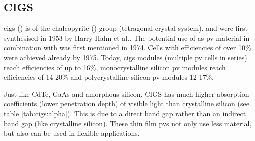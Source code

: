 \subsection{CIGS}
\gls{cigs} () is of the chalcopyrite () group (tetragonal crystal system). 
 and  were first synthesised in 1953 by Harry Hahn et al.\cite{hahn1953untersuchungen}.
The potential use of  as \gls{pv} material in combination with  was first mentioned in 1974\cite{wagner1974cuinse2}.
Cells with efficiencies of over 10\% were achieved already by 1975\cite{kazmerski1976thin}.
Today, 
\gls{cigs} modules (multiple \gls{pv} cells in series) 
reach efficiencies of up to 16\%\cite{feurer2017cigs},
monocrystalline silicon \gls{pv} modules reach efficiencies of 14-20\%
and polycrystalline silicon \gls{pv} modules 12-17\%\cite{mcevoy2011practical}.

Just like CdTe, GaAs and amorphous silicon, CIGS has much higher absorption coefficients 
(lower penetration depth) of visible light than crystalline silicon (see table \ref{tab:cigs:alpha}). 
This is due to a direct band gap rather than an indirect band gap (like crystalline silicon). 
These thin film \gls{pv}s not only use less material, but also can be used in flexible applications. 

